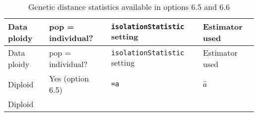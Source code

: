\documentclass[12pt,]{book}
\begin{document}
\begin{longtable}[]{@{}llll@{}}
\caption{\label{tab:isolstats} Genetic distance statistics available in
options 6.5 and 6.6}\tabularnewline
\toprule
\begin{minipage}[b]{0.08\columnwidth}\raggedright\strut
Data ploidy\strut
\end{minipage} & \begin{minipage}[b]{0.16\columnwidth}\raggedright\strut
pop = individual?\strut
\end{minipage} & \begin{minipage}[b]{0.19\columnwidth}\raggedright\strut
\texttt{isolationStatistic} setting\strut
\end{minipage} & \begin{minipage}[b]{0.45\columnwidth}\raggedright\strut
Estimator used\strut
\end{minipage}\tabularnewline
\midrule
\endfirsthead
\toprule
\begin{minipage}[b]{0.08\columnwidth}\raggedright\strut
Data ploidy\strut
\end{minipage} & \begin{minipage}[b]{0.16\columnwidth}\raggedright\strut
pop = individual?\strut
\end{minipage} & \begin{minipage}[b]{0.19\columnwidth}\raggedright\strut
\texttt{isolationStatistic} setting\strut
\end{minipage} & \begin{minipage}[b]{0.45\columnwidth}\raggedright\strut
Estimator used\strut
\end{minipage}\tabularnewline
\midrule
\endhead
\begin{minipage}[t]{0.08\columnwidth}\raggedright\strut
Diploid\strut
\end{minipage} & \begin{minipage}[t]{0.16\columnwidth}\raggedright\strut
Yes (option 6.5)\strut
\end{minipage} & \begin{minipage}[t]{0.19\columnwidth}\raggedright\strut
\texttt{=a}\strut
\end{minipage} & \begin{minipage}[t]{0.45\columnwidth}\raggedright\strut
\(\hat{a}\)\strut
\end{minipage}\tabularnewline
\begin{minipage}[t]{0.08\columnwidth}\raggedright\strut
Diploid\strut
\end{minipage} & \begin{minipage}[t]{0.16\columnwidth}\raggedright\strut

\end{minipage}
\end{longtable}
\end{document}
